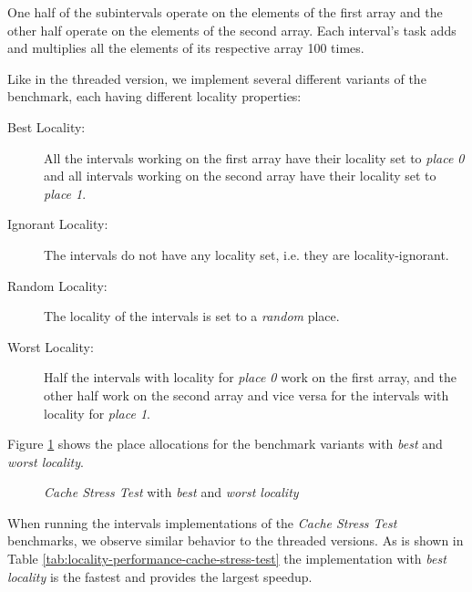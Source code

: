 One half of the subintervals operate on the elements of the first
array and the other half operate on the elements of the second
array. Each interval's task adds and multiplies all the elements of
its respective array 100 times.

Like in the threaded version, we implement several different variants
of the benchmark, each having different locality properties:

\begin{description}
\item[Best Locality:] All the intervals working on the first array
  have their locality set to \emph{place 0} and all intervals working
  on the second array have their locality set to \emph{place 1}.
\item[Ignorant Locality:] The intervals do not have any locality set,
  i.e. they are locality-ignorant.
\item[Random Locality:] The locality of the intervals is set to a
  \emph{random} place.
\item[Worst Locality:] Half the intervals with locality for
  \emph{place 0} work on the first array, and the other half work on
  the second array and vice versa for the intervals with locality for
  \emph{place 1}.
\end{description}

Figure \ref{fig:locality-performance-cache-stress-test-mafushi} shows
the place allocations for the benchmark variants with \emph{best} and
\emph{worst locality}.

\begin{figure}[!ht]
  \centering
  \caption{\emph{Cache Stress Test} with \emph{best} and \emph{worst
      locality}}
  \label{fig:locality-performance-cache-stress-test-mafushi}
\end{figure}

When running the intervals implementations of the \emph{Cache Stress
  Test} benchmarks, we observe similar behavior to the threaded
versions. As is shown in Table
\ref{tab:locality-performance-cache-stress-test} the implementation
with \emph{best locality} is the fastest and provides the largest
speedup.

